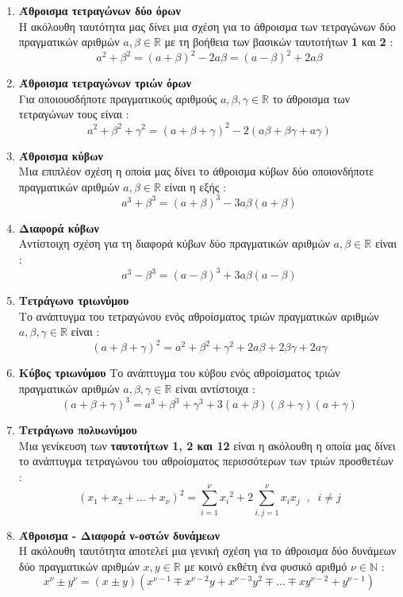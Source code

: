 \documentclass[twoside,10pt]{book}
\begin{document}
\begin{enumerate}[itemsep=0mm,label=\bf\arabic*.,start=8]
\item \textbf{Άθροισμα τετραγώνων δύο όρων}\\
Η ακόλουθη ταυτότητα μας δίνει μια σχέση για το άθροισμα των τετραγώνων δύο πραγματικών αριθμών $ a,\beta\in\mathbb{R} $ με τη βοήθεια των βασικών ταυτοτήτων \textbf{1} και \textbf{2} :
\[ a^2+\beta^2=(a+\beta)^2-2a\beta=(a-\beta)^2+2a\beta \]
\item \textbf{Άθροισμα τετραγώνων τριών όρων}\\
Για οποιουσδήποτε πραγματικούς αριθμούς $ a,\beta,\gamma\in\mathbb{R} $ το άθροισμα των τετραγώνων τους είναι :
\[ a^2+\beta^2+\gamma^2=(a+\beta+\gamma)^2-2(a\beta+\beta\gamma+a\gamma) \]
\item \textbf{Άθροισμα κύβων}\\
Μια επιπλέον σχέση η οποία μας δίνει το άθροισμα κύβων δύο οποιονδήποτε πραγματικών αριθμών $ a,\beta\in\mathbb{R} $ είναι η εξής :
\[ a^3+\beta^3=(a+\beta)^3-3a\beta(a+\beta) \]
\item \textbf{Διαφορά κύβων}\\
Αντίστοιχη σχέση για τη διαφορά κύβων δύο πραγματικών αριθμών $ a,\beta\in\mathbb{R} $ είναι :
\[ a^3-\beta^3=(a-\beta)^3+3a\beta(a-\beta) \]
\item \textbf{Τετράγωνο τριωνύμου}\\
Το ανάπτυγμα του τετραγώνου ενός αθροίσματος τριών πραγματικών αριθμών $ a,\beta,\gamma\in\mathbb{R} $ είναι :
\[ (a+\beta+\gamma)^2=a^2+\beta^2+\gamma^2+2a\beta+2\beta\gamma+2a\gamma \]
\item \textbf{Κύβος τριωνύμου}
Το ανάπτυγμα του κύβου ενός αθροίσματος τριών πραγματικών αριθμών $ a,\beta,\gamma\in\mathbb{R} $ είναι αντίστοιχα :
\[ (a+\beta+\gamma)^3=a^3+\beta^3+\gamma^3+3(a+\beta)(\beta+\gamma)(a+\gamma) \]
\item \textbf{Τετράγωνο πολυωνύμου}\\
Μια γενίκευση των \textbf{ταυτοτήτων  1, 2 και 12} είναι η ακόλουθη η οποία μας δίνει το ανάπτυγμα τετραγώνου του αθροίσματος περισσότερων των τριών προσθετέων :
\[ \left(x_1+x_2+\ldots+x_\nu\right)^2=\sum_{i=1}^\nu{x_i}^2+2\sum_{i,j=1}^\nu{x_ix_j}\;\;,\;\;i\neq j \]
\item \textbf{Άθροισμα - Διαφορά ν-οστών δυνάμεων}\\
Η ακόλουθη ταυτότητα αποτελεί μια γενική σχέση για το άθροισμα δύο δυνάμεων δύο πραγματικών αριθμών $ x,y\in\mathbb{R} $ με κοινό εκθέτη ένα φυσικό αριθμό $ \nu\in\mathbb{N} $ :
\[ x^\nu\pm y^\nu=(x\pm y)\left(x^{\nu-1}\mp x^{\nu-2}y+x^{\nu-3}y^2\mp\ldots\mp xy^{\nu-2}+y^{\nu-1}\right) \]

\end{enumerate}
\end{document}
